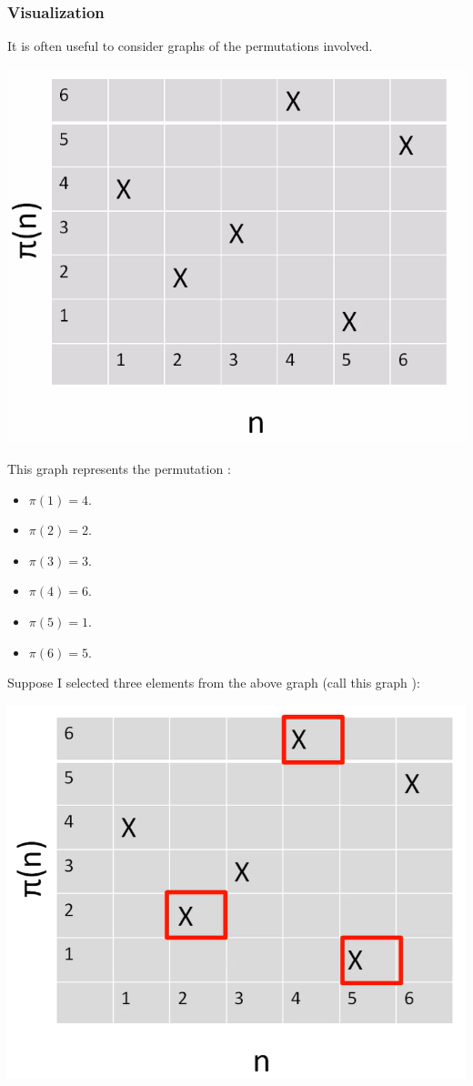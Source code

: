 \documentclass[letterpaper]{article}
\begin{document}
\subsubsection{Visualization}
It is often useful to consider graphs of the permutations involved. 
\begin{center}
    \includegraphics[scale=0.40]{main_permutation.PNG}
\end{center}
This graph represents the permutation :
\begin{itemize}
    \item $\pi(1) = 4$.
    \item $\pi(2) = 2$.
    \item $\pi(3) = 3$.
    \item $\pi(4) = 6$.
    \item $\pi(5) = 1$.
    \item $\pi(6) = 5$.
\end{itemize}
Suppose I selected three elements from the above graph (call this graph ):
\begin{center}
    \includegraphics[scale=0.3]{main_permutation_s.PNG}
\end{center}
\end{document}

